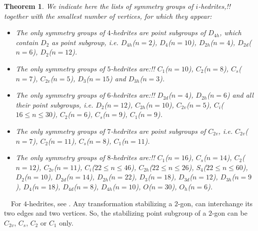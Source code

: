 \documentclass[12pt]{article}
\newtheorem{theorem}{Theorem}
\newcommand{\proof}{\noindent{\bf Proof.}\ \ }
\begin{document}
%
%
%



\begin{theorem}
We indicate here the lists of symmetry groups of $i$-hedrites,!!
together with the smallest number of vertices, for which they
appear:
\begin{itemize}
\item[(i)] The only symmetry groups of $4$-hedrites are point subgroups of $D_{4h}$, which contain $D_{2}$ as point subgroup, i.e. $D_{4h}$($n=2$), $D_4$($n=10$), $D_{2h}$($n=4$), $D_{2d}$($n=6$), $D_2$($n=12$).

\item[(ii)] The only symmetry groups of $5$-hedrites are:!! $C_1$($n=10$), $C_2$($n=8$), $C_s$($n=7$), $C_{2v}$($n=5$), $D_3$($n=15$) and $D_{3h}$($n=3$).

\item[(iii)] The only symmetry groups of $6$-hedrites are:!! $D_{2d}$($n=4$), $D_{2h}$($n=6$) and all their point subgroups, i.e. $D_{2}$($n=12$), $C_{2h}$($n=10$), $C_{2v}$($n=5$), $C_i$($16\le n\le 30$), $C_{2}$($n=6$), $C_{s}$($n=9$), $C_{1}$($n=9$).

\item[(iv)] The only symmetry groups of $7$-hedrites are point subgroups of $C_{2v}$, i.e. $C_{2v}$($n=7$), $C_{2}$($n=11$), $C_{s}$($n=8$), $C_{1}$($n=11$).

\item[(v)] The only symmetry groups of $8$-hedrites are:!! $C_{1}$($n=16$), $C_s$($n=14$), $C_2$($n=12$), $C_{2v}$($n=11$), $C_i$($22\leq n\leq 46$), $C_{2h}$($22\leq n \leq 26$), $S_4$($22\leq n\leq 60$), $D_2$($n=10$), $D_{2d}$($n=14$), $D_{2h}$($n=22$), $D_3$($n=18$), $D_{3d}$($n=12$), $D_{3h}$($n=9$), $D_4$($n=18$), $D_{4d}$($n=8$), $D_{4h}$($n=10$), $O$($n=30$), $O_h$($n=6$).

\end{itemize}


\end{theorem}
\proof For $4$-hedrites, see \cite{DSt}. Any transformation
stabilizing a $2$-gon, can interchange its two edges and two vertices. So, the stabilizing point subgroup of a $2$-gon can be $C_{2v}$, $C_s$, $C_2$ or $C_1$ only.
\end{document}
